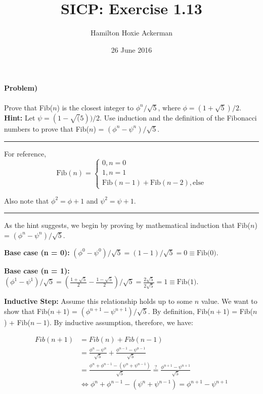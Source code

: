 \documentclass[10pt,letter]{article}
\begin{document}
\title{SICP: Exercise 1.13}
\author{Hamilton Hoxie Ackerman}
\date{26 June 2016}
\maketitle 



\paragraph{Problem)} Prove that Fib($n$) is the closest integer to $\phi^n / \sqrt{5}$, where $\phi = (1 + \sqrt{5})/2$.\\ \textbf{Hint:} Let $\psi = (1 - \sqrt(5))/2$. Use induction and the definition of the Fibonacci numbers to prove that Fib($n$) = $(\phi^n - \psi^n)/\sqrt{5}$. \\

\rule{\textwidth}{1pt}

For reference, 
\[
    \text{Fib}(n)=\begin{cases}
               0, n = 0 \\
               1, n = 1 \\
               \text{Fib}(n-1) + \text{Fib}(n-2), \text{else}
            \end{cases}
\]

Also note that $\phi^2 = \phi + 1$ and $\psi^2 = \psi + 1$.

\rule{\textwidth}{1pt}

As the hint suggests, we begin by proving by mathematical induction that Fib($n$) = $(\phi^n - \psi^n)/\sqrt{5}$.

\textbf{Base case (n = 0):} $(\phi^0 - \psi^0)/\sqrt{5} = (1 - 1) / \sqrt{5} = 0 \equiv \text{Fib(0)}$.

\textbf{Base case (n = 1):} $(\phi^1 - \psi^1)/\sqrt{5} = (\frac{1 + \sqrt{5}}{2} - \frac{1 - \sqrt{5}}{2}) / \sqrt{5} = \frac{2 \sqrt{5}}{2 \sqrt{5}} = 1 \equiv \text{Fib(1)}$.

\textbf{Inductive Step:} Assume this relationship holds up to some $n$ value. We want to show that Fib($n + 1$) = $(\phi^{n+1} - \psi^{n+1})/\sqrt{5}$. By definition, Fib($n + 1$) = Fib($n$) + Fib($n-1$). By inductive assumption, therefore, we have:

\begin{align*}
    Fib(n+1) &= Fib(n) + Fib(n-1)\\
             &= \frac{\phi^n - \psi^n}{\sqrt{5}} + 
                \frac{\phi^{n-1} - \psi^{n-1}}{\sqrt{5}}\\
             &= \frac{\phi^n + \phi^{n-1} - (\psi^n + \psi^{n-1})}{\sqrt{5}}
             \stackrel{?}{=} \frac{\phi^{n+1} - \psi^{n+1}}{\sqrt{5}} \\
             &\Leftrightarrow  \phi^n + \phi^{n-1} - (\psi^n + \psi^{n-1}) = \phi^{n+1} - \psi^{n+1}
\end{align*}
\end{document}
